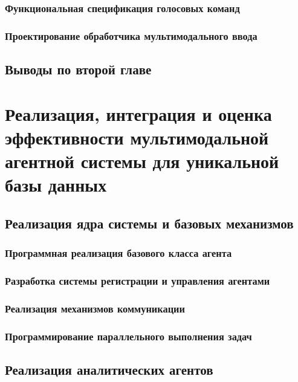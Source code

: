 \documentclass{syksu-coursework}
\begin{document}
\subsubsection{Функциональная спецификация голосовых команд}

\subsubsection{Проектирование обработчика мультимодального ввода}

\subsection*{Выводы по второй главе}

\newpage

\section{Реализация, интеграция и оценка эффективности мультимодальной агентной системы для уникальной базы данных}

\subsection{Реализация ядра системы и базовых механизмов}

\subsubsection{Программная реализация базового класса агента}

\subsubsection{Разработка системы регистрации и управления агентами}

\subsubsection{Реализация механизмов коммуникации}

\subsubsection{Программирование параллельного выполнения задач}

\subsection{Реализация аналитических агентов}
\end{document}
